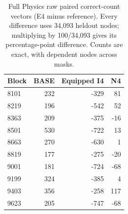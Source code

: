 \begin{table}[t]
\centering\footnotesize\setlength{\tabcolsep}{3pt}
\caption{Physics E4 minus each primary reference, in percentage points. Both are required; simultaneous intervals follow the frozen two-contrast Bonferroni rule.}
\label{tab:physics-inference-v5}
\end{table}
\begin{table}[t]
\centering\footnotesize\setlength{\tabcolsep}{3pt}
\caption{Full Physics raw paired correct-count vectors (E4 minus reference). Every difference uses 34,093 heldout nodes; multiplying by 100/34,093 gives its percentage-point difference. Counts are exact, with dependent nodes across masks.}
\label{tab:physics-vectors-v5}
\begin{tabular}{lrrr}
\toprule
Block & BASE & Equipped I4 & N4\\
\midrule
8101 & 232 & -329 & 81\\
8219 & 196 & -542 & 52\\
8363 & 209 & -375 & -16\\
8501 & 530 & -722 & 13\\
8663 & 270 & -630 & 1\\
8819 & 177 & -275 & -20\\
9001 & 181 & -724 & -68\\
9199 & 324 & -385 & 4\\
9403 & 356 & -258 & 117\\
9623 & 205 & -747 & -68\\
\bottomrule
\end{tabular}
\end{table}
